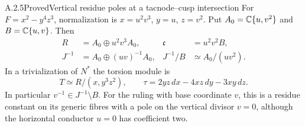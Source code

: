 
\begin{statement}{A.2.5}{Proved}{Vertical residue poles at a tacnode--cusp intersection}
For $F=x^2-y^4z^3$, normalization is $x=u^2v^3$, $y=u$, $z=v^2$. Put $A_0=\mathbb C\{u,v^2\}$ and $B=\mathbb C\{u,v\}$. Then
\[
 \begin{aligned}
 R&=A_0\oplus u^2v^3A_0,&\mathfrak c&=u^2v^2B,\\
 J^{-1}&=A_0\oplus(uv)^{-1}A_0,&
 J^{-1}/B&\simeq A_0/(uv^2).
 \end{aligned}
 \tag{A.9a}
\]
In a trivialization of $N^*$ the torsion module is
\[
 T\simeq R/(x,y^3z^2),\qquad
 \tau=2yz\,dx-4xz\,dy-3xy\,dz.
 \tag{A.9b}
\]
In particular $v^{-1}\in J^{-1}\setminus B$. For the ruling with base coordinate $v$, this is a residue constant on its generic fibres with a pole on the vertical divisor $v=0$, although the horizontal conductor $u=0$ has coefficient two.
\end{statement}
